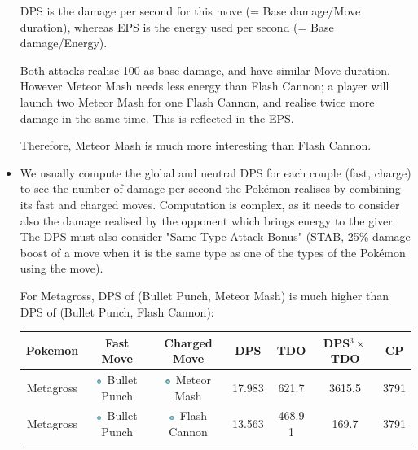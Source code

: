 \documentclass[12pt]{beamer}
\newcommand{\psysimp}{\includegraphics[height=0.15cm]{../../images/type/simplified/psy.png}}
\newcommand{\steelsimp}{\includegraphics[height=0.15cm]{../../images/type/simplified/steel.png}}
\begin{document}
\begin{frame}
\begin{block}{}
\begin{footnotesize}
\begin{itemize}
DPS is the damage per second for this move (= Base damage/Move duration), whereas EPS is the energy used per second (= Base damage/Energy).

Both attacks realise 100 as base damage, and have similar Move duration. However Meteor Mash needs less energy than Flash Cannon; a player will launch two Meteor Mash for one Flash Cannon, and realise twice more damage in the same time. This is reflected in the EPS.

Therefore, Meteor Mash is much more interesting than Flash Cannon.
\item We usually compute the global and neutral DPS for each couple (fast, charge) to see the number of damage per second the Pok\'emon realises by combining its fast and charged moves. Computation is complex, as it needs to consider also the damage realised by the opponent which brings energy to the giver. The DPS must also consider  "Same Type Attack Bonus" (STAB, 25\% damage boost of a move when it is the same type as one of the types of the Pokémon using the move). 

\begin{center}
   \href{https://pokemongo.gamepress.gg/tdo-how-calculate-pokemon-ability-outdated}{} \quad \quad 
   \href{https://pokemongo.gamepress.gg/comprehensive-dps-spreadsheet}{}
\end{center}

For Metagross, DPS of (Bullet Punch, Meteor Mash) is much higher than DPS of (Bullet Punch, Flash Cannon):
\begin{center}
\begin{tabular}{ccccccc}
Pokemon & Fast Move & Charged Move & DPS & TDO & DPS$^3 \times$ TDO & CP \\ \hline
Metagross	 & \steelsimp~Bullet Punch	& \steelsimp~Meteor Mash&	17.983	&621.7	&3615.5	&3791\\
Metagross	& \steelsimp~Bullet Punch	& \steelsimp~Flash Cannon&	13.563	&468.9	1&169.7&	3791\\
\end{tabular}
\end{center}
\end{itemize}

\end{footnotesize}
\end{block}
\end{frame}
\end{document}
